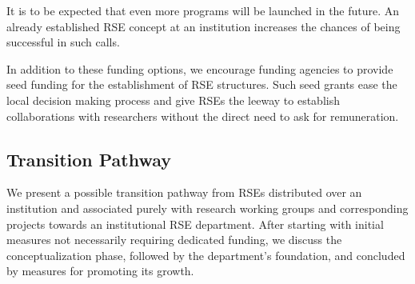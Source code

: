 \documentclass[a4paper]{article}
\begin{document}
\begin{enumerate}
      It is to be expected that even more programs will be launched in the future.
      An already established RSE concept at an institution increases the chances of being successful in such calls.
\end{enumerate}

In addition to these funding options, we encourage funding agencies to provide seed funding for the establishment of RSE structures.
Such seed grants ease the local decision making process and give RSEs the leeway to establish collaborations with researchers without the direct need to ask for remuneration.


\subsection{Transition Pathway}

We present a possible transition pathway from RSEs distributed over an institution and associated purely with research working groups and corresponding projects towards an institutional RSE department.
After starting with initial measures not necessarily requiring dedicated funding, we discuss the conceptualization phase, followed by the department's foundation, and concluded by measures for promoting its growth.
\end{document}
